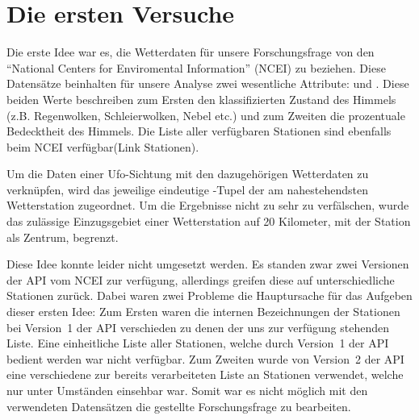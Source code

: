 \section{Die ersten Versuche} \label{versuch1}
Die erste Idee war es, die Wetterdaten für unsere Forschungsfrage von den \enquote{National Centers for Enviromental Information} (NCEI) zu beziehen. Diese Datensätze beinhalten für unsere Analyse zwei wesentliche Attribute:  und . Diese beiden Werte beschreiben zum Ersten den klassifizierten Zustand des Himmels (z.B. Regenwolken, Schleierwolken, Nebel etc.) und zum Zweiten die prozentuale Bedecktheit des Himmels. Die Liste aller verfügbaren Stationen sind ebenfalls beim NCEI verfügbar(Link Stationen).

Um die Daten einer Ufo-Sichtung mit den dazugehörigen Wetterdaten zu verknüpfen, wird das jeweilige eindeutige -Tupel der am nahestehendsten Wetterstation zugeordnet. Um die Ergebnisse nicht zu sehr zu verfälschen, wurde das zulässige Einzugsgebiet einer Wetterstation auf 20 Kilometer, mit der Station als Zentrum, begrenzt.

Diese Idee konnte leider nicht umgesetzt werden. Es standen zwar zwei Versionen der API vom NCEI zur verfügung, allerdings greifen diese auf unterschiedliche Stationen zurück. Dabei waren zwei Probleme die Hauptursache für das Aufgeben dieser ersten Idee: Zum Ersten waren die internen Bezeichnungen der Stationen bei Version~1 der API verschieden zu denen der uns zur verfügung stehenden Liste\cite{v1:2021}. Eine einheitliche Liste aller Stationen, welche durch Version~1 der API bedient werden war nicht verfügbar. Zum Zweiten wurde von Version~2 der API eine verschiedene zur bereits verarbeiteten Liste an Stationen verwendet, welche nur unter Umständen einsehbar war\cite{v2:2021}. Somit war es nicht möglich mit den verwendeten Datensätzen die gestellte Forschungsfrage zu bearbeiten.